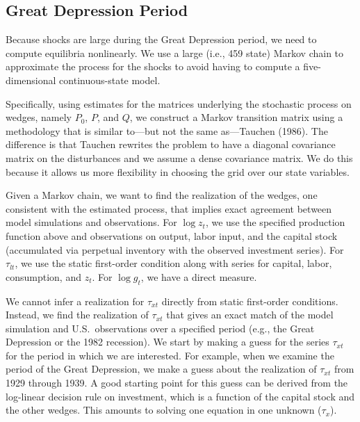 \subsection{Great Depression Period}

Because shocks are large during the Great Depression 
period, we need to compute equilibria nonlinearly.
We use a large (i.e., 459 state) Markov chain to approximate
the process for the shocks to avoid
having to compute a five-dimensional continuous-state
model.  

Specifically, using estimates for the matrices underlying the 
stochastic process on wedges, namely $P_0$, $P$,
and $Q$, we construct a Markov transition matrix
using a methodology that is similar to---but not the
same as---Tauchen (1986).
The difference is that Tauchen rewrites the problem
to have a diagonal covariance matrix on the disturbances
and we assume a dense covariance matrix.  We do this
because it allows us more flexibility in choosing the
grid over our state variables.

Given a Markov chain, we want to find the realization
of the wedges, one consistent with the estimated
process, that implies exact agreement between model
simulations and observations.
For $\log z_t$, we use the specified production function
above and observations on output, labor input, and the
capital stock (accumulated via perpetual inventory with
the observed investment series).
For $\tau_{lt}$, we use the static first-order
condition  along with series for
capital, labor, consumption, and $z_t$.
For $\log g_t$, we have a direct measure.

We cannot infer a realization for $\tau_{xt}$ directly
from static first-order conditions.   Instead, we
find the realization of $\tau_{xt}$ that gives an
exact match of the model simulation and U.S.~observations
over a specified period (e.g., the Great Depression
or the 1982 recession).
We start by making a guess for the series $\tau_{xt}$ 
for the period in which we are interested.  For example, when
we examine the period of the Great Depression, we 
make a guess about the realization of $\tau_{xt}$
from 1929 through 1939.    A good starting point for
this guess can be derived from the log-linear decision
rule on investment, which is a function of the capital
stock and the other wedges.    This amounts to solving
one equation in one unknown ($\tau_x$).

